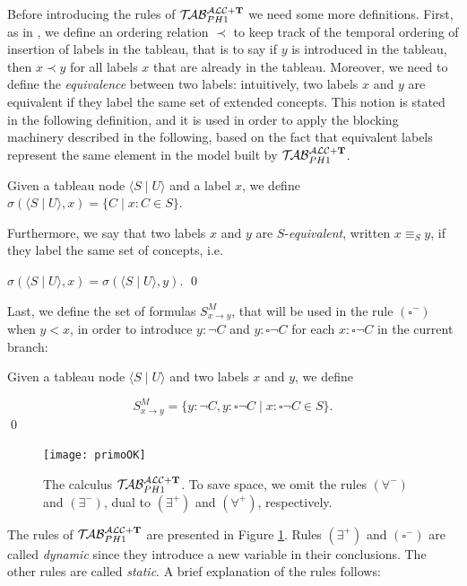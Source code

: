 \documentclass[a4paper, 11pt, oneside]{duthesis}
\newcommand{\tip}{{\bf T}}
\newcommand{\nott} {\lnot}
\newcommand{\tc} {\mid}
\newcommand{\imp} {\rightarrow}
\newcommand{\bbox}{\square}
\newcommand{\sx} {\langle}
\newcommand{\dx} {\rangle}
\newcommand{\perogni} {\forall}
\newcommand{\esiste} {\exists}
\newcommand{\Gammam}[2]{S^{M}_{#1 \imp #2}}
\newcommand{\primo}{\mathrel{{\mathcal{T}\!\mathcal{AB}}}_{PH 1}^{\mathcal{ALC}+\mbox{\scriptsize $\tip$}}}
\newenvironment{definition}
{\begin{defi} \rm}{\qed \end{defi}}
\newenvironment{definition}
{\begin{defi} \rm}{\qed \end{defi}}
\newtheorem{definition}{Definition}
\newcounter{posu}
\newtheorem{definition}[posu]{Definition}
\begin{document}
Before introducing the rules of $\primo$ we need some more definitions.
First, as in \cite{buchheit-et-al}, we define an ordering relation $\prec$ to keep track of the temporal ordering of insertion of labels in the tableau, that is to say if $y$ is introduced in the tableau, then $x \prec y$ for all labels $x$ that are already in the tableau.
Moreover, we need to define the \emph{equivalence} between two labels: intuitively, two labels $x$ and $y$ are equivalent if they label the same set of extended concepts.
This notion is stated in the following definition, and it is used in order to apply the blocking machinery described in the following, based on the fact that equivalent labels represent the same element in the model built by $\primo$.

\begin{definition}
Given a tableau node $\sx S \tc U \dx$ and a label $x$, we define
$\sigma(\sx S \tc U \dx,x)=\{C \tc x: C \in S\}.$

\noindent Furthermore, we say that two labels $x$ and $y$ are $S$-\emph{equivalent}, written $x \equiv_S y$, if they label the same set of concepts, i.e.

$\sigma(\sx S \tc U \dx,x)=\sigma(\sx S \tc U \dx,y).$
\end{definition}

\noindent Last, we define the set of formulas $\Gammam{x}{y}$, that will be used in the rule $(\bbox^-)$ when $y<x$, in order to introduce $y: \nott C$ and $y: \bbox \nott C$ for each $x: \bbox \nott C$ in the current branch:

\begin{definition}
Given a tableau node $\sx S \tc U \dx$ and two labels $x$ and $y$, we define

$$\Gammam{x}{y}=\{y: \nott C, y: \bbox \nott C \tc x: \bbox \nott C \in S\}.$$
\end{definition}


\begin{figure}[t]{
\centerline{
	\texttt{[image: primoOK]}
	}
}
\caption{The calculus $\primo$. To save space, we omit the rules $(\perogni^-)$ and $(\esiste^-)$, dual to $(\esiste^+)$ and $(\perogni^+)$, respectively.}
\label{immagine calcolo}
\end{figure}


\noindent The rules of $\primo$ are presented in Figure \ref{immagine calcolo}.
Rules $(\esiste^{+})$ and $(\bbox^{-})$ are called \emph{dynamic} since they introduce a new variable in their conclusions.
The other rules are called \emph{static}.
A brief explanation of the rules follows:
\end{document}
